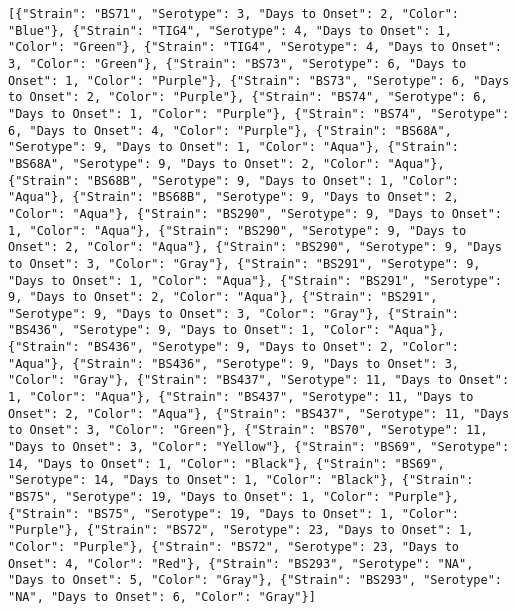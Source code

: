 \begin{verbatim}
[{"Strain": "BS71", "Serotype": 3, "Days to Onset": 2, "Color": "Blue"}, {"Strain": "TIG4", "Serotype": 4, "Days to Onset": 1, "Color": "Green"}, {"Strain": "TIG4", "Serotype": 4, "Days to Onset": 3, "Color": "Green"}, {"Strain": "BS73", "Serotype": 6, "Days to Onset": 1, "Color": "Purple"}, {"Strain": "BS73", "Serotype": 6, "Days to Onset": 2, "Color": "Purple"}, {"Strain": "BS74", "Serotype": 6, "Days to Onset": 1, "Color": "Purple"}, {"Strain": "BS74", "Serotype": 6, "Days to Onset": 4, "Color": "Purple"}, {"Strain": "BS68A", "Serotype": 9, "Days to Onset": 1, "Color": "Aqua"}, {"Strain": "BS68A", "Serotype": 9, "Days to Onset": 2, "Color": "Aqua"}, {"Strain": "BS68B", "Serotype": 9, "Days to Onset": 1, "Color": "Aqua"}, {"Strain": "BS68B", "Serotype": 9, "Days to Onset": 2, "Color": "Aqua"}, {"Strain": "BS290", "Serotype": 9, "Days to Onset": 1, "Color": "Aqua"}, {"Strain": "BS290", "Serotype": 9, "Days to Onset": 2, "Color": "Aqua"}, {"Strain": "BS290", "Serotype": 9, "Days to Onset": 3, "Color": "Gray"}, {"Strain": "BS291", "Serotype": 9, "Days to Onset": 1, "Color": "Aqua"}, {"Strain": "BS291", "Serotype": 9, "Days to Onset": 2, "Color": "Aqua"}, {"Strain": "BS291", "Serotype": 9, "Days to Onset": 3, "Color": "Gray"}, {"Strain": "BS436", "Serotype": 9, "Days to Onset": 1, "Color": "Aqua"}, {"Strain": "BS436", "Serotype": 9, "Days to Onset": 2, "Color": "Aqua"}, {"Strain": "BS436", "Serotype": 9, "Days to Onset": 3, "Color": "Gray"}, {"Strain": "BS437", "Serotype": 11, "Days to Onset": 1, "Color": "Aqua"}, {"Strain": "BS437", "Serotype": 11, "Days to Onset": 2, "Color": "Aqua"}, {"Strain": "BS437", "Serotype": 11, "Days to Onset": 3, "Color": "Green"}, {"Strain": "BS70", "Serotype": 11, "Days to Onset": 3, "Color": "Yellow"}, {"Strain": "BS69", "Serotype": 14, "Days to Onset": 1, "Color": "Black"}, {"Strain": "BS69", "Serotype": 14, "Days to Onset": 1, "Color": "Black"}, {"Strain": "BS75", "Serotype": 19, "Days to Onset": 1, "Color": "Purple"}, {"Strain": "BS75", "Serotype": 19, "Days to Onset": 1, "Color": "Purple"}, {"Strain": "BS72", "Serotype": 23, "Days to Onset": 1, "Color": "Purple"}, {"Strain": "BS72", "Serotype": 23, "Days to Onset": 4, "Color": "Red"}, {"Strain": "BS293", "Serotype": "NA", "Days to Onset": 5, "Color": "Gray"}, {"Strain": "BS293", "Serotype": "NA", "Days to Onset": 6, "Color": "Gray"}]
\end{verbatim}
